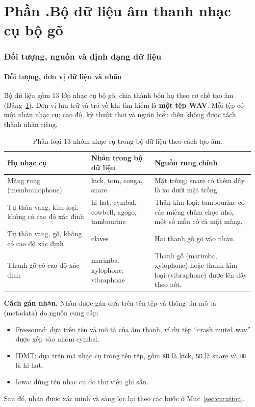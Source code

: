 \documentclass[11pt,a4paper]{article}
\newcommand{\phan}[1]{\clearpage\refstepcounter{part}\part*{Phần \thepart.\texorpdfstring{\enspace}{ }#1}}
\begin{document}
\phan{Bộ dữ liệu âm thanh nhạc cụ bộ gõ}
\section{Đối tượng, nguồn và định dạng dữ liệu}\label{sec:nguon}
\subsection{Đối tượng, đơn vị dữ liệu và nhãn}
Bộ dữ liệu gồm 13 lớp nhạc cụ bộ gõ, chia thành bốn họ theo cơ chế tạo âm (Bảng~\ref{tab:phanloai}). Đơn vị lưu trữ và trả về khi tìm kiếm là \textbf{một tệp WAV}. Mỗi tệp có một nhãn nhạc cụ; cao độ, kỹ thuật chơi và người biểu diễn không được tách thành nhãn riêng.

\begin{table}[htbp]
\centering\small
\caption{Phân loại 13 nhóm nhạc cụ trong bộ dữ liệu theo cách tạo âm.}\label{tab:phanloai}
\begin{tabularx}{\textwidth}{p{}p{}X}
\toprule
Họ nhạc cụ & Nhãn trong bộ dữ liệu & Nguồn rung chính\\\midrule
Màng rung (membranophone) & kick, tom, conga, snare & Mặt trống; snare có thêm dây lò xo dưới mặt trống.\\
Tự thân vang, kim loại, không có cao độ xác định & hi-hat, cymbal, cowbell, agogo, tambourine & Thân kim loại; tambourine có các miếng chũm chọe nhỏ, một số mẫu có cả mặt màng.\\
Tự thân vang, gỗ, không có cao độ xác định & claves & Hai thanh gỗ gõ vào nhau.\\
Thanh gõ có cao độ xác định & marimba, xylophone, vibraphone & Thanh gỗ (marimba, xylophone) hoặc thanh kim loại (vibraphone) được lên dây theo nốt.\\\bottomrule
\end{tabularx}
\end{table}

\textbf{Cách gán nhãn.} Nhãn được gán dựa trên tên tệp và thông tin mô tả (metadata) do nguồn cung cấp:
\begin{itemize}
\item Freesound: dựa trên tên và mô tả của âm thanh, ví dụ tệp ``crash mute1.wav'' được xếp vào nhóm cymbal.
\item IDMT: dựa trên mã nhạc cụ trong tên tệp, gồm \texttt{KD} là kick, \texttt{SD} là snare và \texttt{HH} là hi-hat.
\item Iowa: dùng tên nhạc cụ do thư viện ghi sẵn.
\end{itemize}
Sau đó, nhãn được xác minh và sàng lọc lại theo các bước ở Mục~\ref{sec:curation}.
\end{document}
